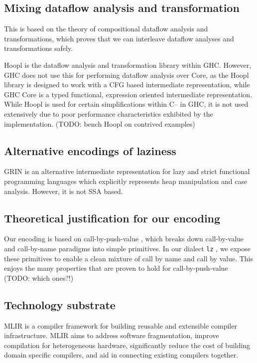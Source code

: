 \documentclass[sigplan,\review anonymous]{acmart}
\newcommand{\lz}{\texttt{lz} }
\begin{document}
{\subsection{Mixing dataflow analysis and transformation}

This is based on the theory of compositional dataflow analysis
and transformations, \cite{lerner2002composing} 
which proves that we can interleave dataflow analyses and transformations
safely.

Hoopl \cite{ramsey2010hoopl} is the dataflow analysis and transformation library
within GHC. However, GHC does not use this for performing dataflow analysis
over Core, as the Hoopl library is designed to work with a CFG based
intermediate representation, while GHC Core is a typed functional, expression
oriented intermediate representation. While Hoopl is used for certain simplifications
within C-- in GHC, it is not used extensively due to  poor performance characteristics
exhibited by the implementation. (TODO: bench Hoopl on contrived examples)

\subsection{Alternative encodings of laziness}

GRIN  \cite{boquist1996grin} is an alternative intermediate representation
for lazy and strict functional programming languages which explicitly represents
heap manipulation and case analysis. However, it is not SSA based.

\subsection{Theoretical justification for our encoding}

Our encoding is based on call-by-push-value \cite{levy2012call}, which
breaks down call-by-value and call-by-name paradigms into simple primitives. In
our dialect \lz, we expose these primitives to enable a clean mixture of
call by name and call by value. This enjoys the many properties that
are proven to hold for call-by-push-value (TODO: which ones?!)


\subsection{Technology substrate}
                                                         
MLIR \cite{lattner2020mlir} is a compiler framework for building reusable and
extensible compiler infrastructure.  MLIR aims to address software
fragmentation, improve compilation for heterogeneous hardware, significantly
reduce the cost of building domain specific compilers, and aid in connecting
existing compilers together.

}
\end{document}
